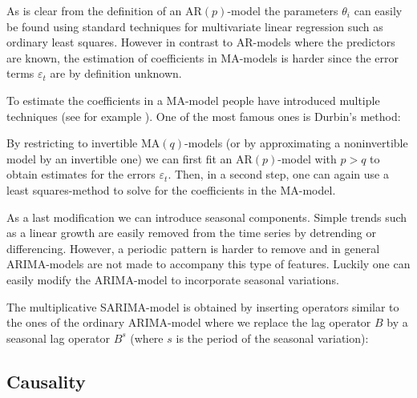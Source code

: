 {    

    \begin{remark}
        As is clear from the definition of an AR$(p)$-model the parameters $\theta_i$ can easily be found using standard techniques for multivariate linear regression such as ordinary least squares. However in contrast to AR-models where the predictors are known, the estimation of coefficients in MA-models is harder since the error terms $\varepsilon_t$ are by definition unknown.
    \end{remark}
    To estimate the coefficients in a MA-model people have introduced multiple techniques (see for example \cite{MA_fit}). One of the most famous ones is Durbin's method:
    \begin{method}[Durbin]
        By restricting to invertible MA$(q)$-models (or by approximating a noninvertible model by an invertible one) we can first fit an AR$(p)$-model with $p>q$ to obtain estimates for the errors $\varepsilon_t$. Then, in a second step, one can again use a least squares-method to solve for the coefficients in the MA-model.
    \end{method}

    As a last modification we can introduce seasonal components. Simple trends such as a linear growth are easily removed from the time series by detrending or differencing. However, a periodic pattern is harder to remove and in general ARIMA-models are not made to accompany this type of features. Luckily one can easily modify the ARIMA-model to incorporate seasonal variations.

    The multiplicative SARIMA-model is obtained by inserting operators similar to the ones of the ordinary ARIMA-model where we replace the lag operator $B$ by a seasonal lag operator $B^s$ (where $s$ is the period of the seasonal variation):

\subsection{Causality}

    }
